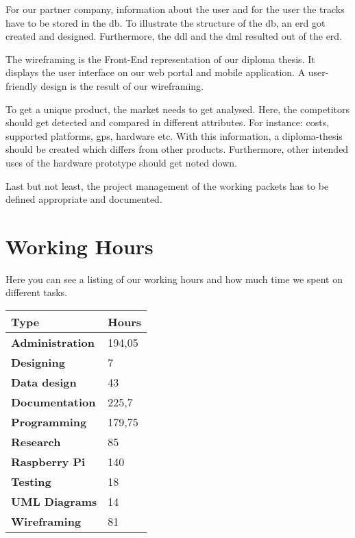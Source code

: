 For our partner company, information about the user and for the user the tracks have to be stored in the \gls{db}. To illustrate the structure of the \gls{db}, an \gls{erd} got created and designed. Furthermore, the \gls{ddl} and the \gls{dml} resulted out of the \gls{erd}.

The wireframing is the Front-End representation of our diploma thesis. It displays the user interface on our web portal and mobile application. A user-friendly design is the result of our wireframing.

To get a unique product, the market needs to get analysed. Here, the competitors should get detected and compared in different attributes. For instance: costs, supported platforms, \gls{gps}, hardware etc. With this information, a diploma-thesis should be created which differs from other products. Furthermore, other intended uses of the hardware prototype should get noted down.

Last but not least, the project management of the working packets has to be defined appropriate and documented.
\section*{Working Hours}
Here you can see a listing of our working hours and how much time we spent on different tasks. \newline
\begin{center}
\begin{tabular}{p{5cm}p{2cm}}
\toprule
\textbf{Type} & \textbf{Hours} \\
\midrule
\textbf{Administration} & 194,05 \\
\textbf{Designing} & 7 \\
\textbf{Data design} & 43 \\
\textbf{Documentation} & 225,7 \\
\textbf{Programming} & 179,75 \\
\textbf{Research} & 85 \\
\textbf{Raspberry Pi} & 140 \\
\textbf{Testing} & 18 \\
\textbf{UML Diagrams} & 14 \\
\textbf{Wireframing} & 81 \\
\bottomrule
\end{tabular}
\end{center}

